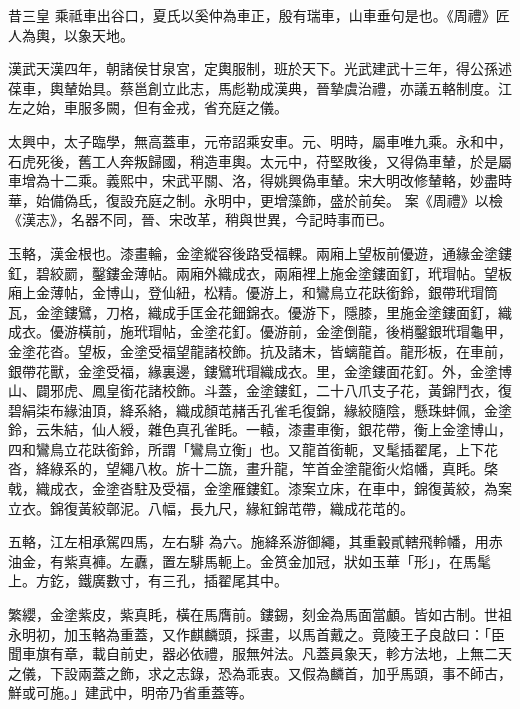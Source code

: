 
\begin{pinyinscope}

 昔三皇
 乘祗車出谷口，夏氏以奚仲為車正，殷有瑞車，山車垂句是也。《周禮》匠人為輿，以象天地。



 漢武天漢四年，朝諸侯甘泉宮，定輿服制，班於天下。光武建武十三年，得公孫述葆車，輿輦始具。蔡邕創立此志，馬彪勒成漢典，晉摯虞治禮，亦議五輅制度。江左之始，車服多闕，但有金戎，省充庭之儀。



 太興中，太子臨學，無高蓋車，元帝詔乘安車。元、明時，屬車唯九乘。永和中，石虎死後，舊工人奔叛歸國，稍造車輿。太元中，苻堅敗後，又得偽車輦，於是屬車增為十二乘。義熙中，宋武平關、洛，得姚興偽車輦。宋大明改修輦輅，妙盡時華，始備偽氐，復設充庭之制。永明中，更增藻飾，盛於前矣。
 案《周禮》以檢《漢志》，名器不同，晉、宋改革，稍與世異，今記時事而已。



 玉輅，漢金根也。漆畫輪，金塗縱容後路受福輠。兩廂上望板前優遊，通緣金塗鏤釭，碧絞罽，鑿鏤金薄帖。兩廂外織成衣，兩廂裡上施金塗鏤面釘，玳瑁帖。望板廂上金薄帖，金博山，登仙紐，松精。優游上，和鸞鳥立花趺銜鈴，銀帶玳瑁筒瓦，金塗鏤鷿，刀格，織成手匡金花鈿錦衣。優游下，隱膝，里施金塗鏤面釘，織成衣。優游橫前，施玳瑁帖，金塗花釘。優游前，金塗倒龍，後梢鑿銀玳瑁龜甲，金塗花沓。望板，金塗受福望龍諸校飾。抗及諸末，皆螭龍首。龍形板，在車前，銀帶花獸，金塗受福，緣裏邊，鏤鷿玳瑁織成衣。里，金塗鏤面花釘。外，金塗博山、闢邪虎、鳳皇銜花諸校飾。斗蓋，金塗鏤釭，二十八爪支子花，黃錦鬥衣，復碧絹柒布緣油頂，絳系絡，織成顏芚赭舌孔雀毛復錦，緣絞隨陰，懸珠蚌佩，金塗鈴，云朱結，仙人綬，雜色真孔雀眊。一轅，漆畫車衡，銀花帶，衡上金塗博山，四和鸞鳥立花趺銜鈴，所謂「鸞鳥立衡」也。又龍首銜軛，叉髦插翟尾，上下花沓，絳綠系的，望繩八枚。旂十二旒，畫升龍，竿首金塗龍銜火焰幡，真眊。棨戟，織成衣，金塗沓駐及受福，金塗雁鏤釭。漆案立床，在車中，錦復黃絞，為案立衣。錦復黃絞鄣泥。八幅，長九尺，緣紅錦芚帶，織成花芚的。



 五輅，江左相承駕四馬，左右騑
 為六。施絳系游御繩，其重轂貳轄飛軨幡，用赤油金，有紫真褲。左纛，置左騑馬軛上。金筼金加冠，狀如玉華「形」，在馬髦上。方釳，鐵廣數寸，有三孔，插翟尾其中。



 繁纓，金塗紫皮，紫真眊，橫在馬膺前。鏤錫，刻金為馬面當顱。皆如古制。世祖永明初，加玉輅為重蓋，又作麒麟頭，採畫，以馬首戴之。竟陵王子良啟曰：「臣聞車旗有章，載自前史，器必依禮，服無舛法。凡蓋員象天，軫方法地，上無二天之儀，下設兩蓋之飾，求之志錄，恐為乖衷。又假為麟首，加乎馬頭，事不師古，鮮或可施。」建武中，明帝乃省重蓋等。




\end{pinyinscope}
